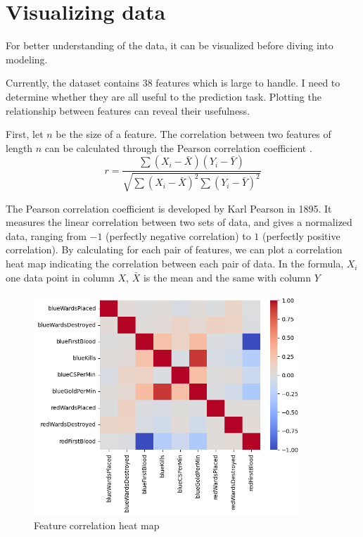 \documentclass[stu,12pt,floatsintext]{apa7}
\begin{document}
\section{Visualizing data}
For better understanding of the data, it can be visualized before diving into modeling.

Currently, the dataset contains 38 features which is large to handle. I need to determine whether they are all useful to the prediction task. Plotting the relationship between features can reveal their usefulness. 

First, let $n$ be the size of a feature. The correlation between two features of length $n$ can be calculated through the Pearson correlation coefficient \parencite{pearson-correlation}. 
\begin{equation}
   r = \frac{\sum (X_i - \bar{X})(Y_i - \bar{Y})}{\sqrt{\sum (X_i - \bar{X})^2 \sum (Y_i - \bar{Y})^2}} 
\end{equation}


The Pearson correlation coefficient is developed by Karl Pearson in 1895. It measures the linear correlation between two sets of data, and gives a normalized data, ranging from $-1$ (perfectly negative correlation) to $1$ (perfectly positive correlation). By calculating for each pair of features, we can plot a correlation heat map indicating the correlation between each pair of data. In the formula, $X_i$ one data point in column $X$, $\bar{X}$ is the mean and the same with column $Y$

\begin{figure}[h]
    \centering
    \includegraphics[width=0.9\textwidth]{images/heatmap.png}
    \caption{Feature correlation heat map}
    \label{fig:heat-map}
\end{figure}
\end{document}
